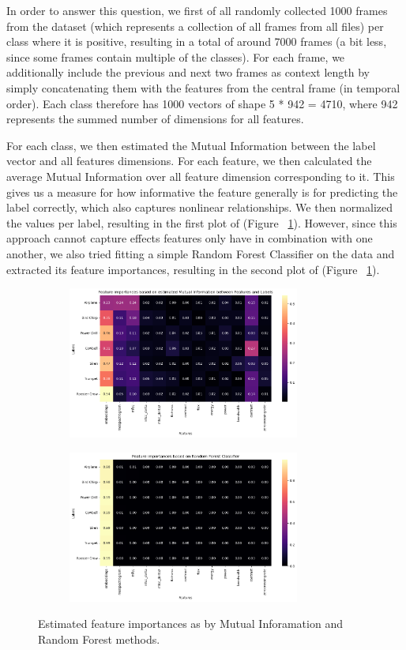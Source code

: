 In order to answer this question, we first of all randomly collected 1000 frames from the dataset (which represents a collection of all frames from all files) per class where it is positive, resulting in a total of around 7000 frames (a bit less, since some frames contain multiple of the classes). For each frame, we additionally include the previous and next two frames as context length by simply concatenating them with the features from the central frame (in temporal order). Each class therefore has 1000 vectors of shape 5 * 942 = 4710, where 942 represents the summed number of dimensions for all features.

For each class, we then estimated the Mutual Information between the label vector and all features dimensions. For each feature, we then calculated the average Mutual Information over all feature dimension corresponding to it. This gives us a measure for how informative the feature generally is for predicting the label correctly, which also captures nonlinear relationships. We then normalized the values per label, resulting in the first plot of (Figure ~\ref{fig:1_FI}). However, since this approach cannot capture effects features only have in combination with one another, we also tried fitting a simple Random Forest Classifier on the data and extracted its feature importances, resulting in the second plot of (Figure ~\ref{fig:1_FI}).

\begin{figure}[htbp]
  \centering
  \begin{subfigure}[b]{0.49\textwidth}
    \includegraphics[width=\textwidth, height=5cm]{figs/1_MI.png}
  \end{subfigure}
  \hfill
  \begin{subfigure}[b]{0.49\textwidth}
    \includegraphics[width=\textwidth, height=5cm]{figs/1_RF.png}
  \end{subfigure}
  \caption{Estimated feature importances as by Mutual Inforamation and Random Forest methods.}
  \label{fig:1_FI}
\end{figure}


